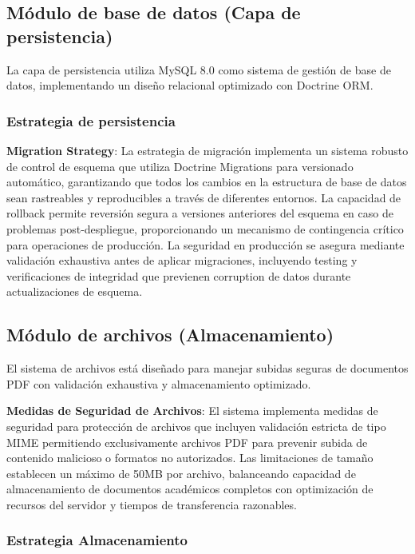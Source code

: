 \documentclass[12pt,a4paper,oneside]{report}
\begin{document}
\subsection{Módulo de base de datos (Capa de
persistencia)}\label{muxf3dulo-de-base-de-datos-capa-de-persistencia}

La capa de persistencia utiliza MySQL 8.0 como sistema de gestión de
base de datos, implementando un diseño relacional optimizado con
Doctrine ORM.

\subsubsection{Estrategia de
persistencia}\label{estrategia-de-persistencia}

\textbf{Migration Strategy}: La estrategia de migración implementa un sistema robusto de control de esquema que utiliza Doctrine Migrations para versionado automático, garantizando que todos los cambios en la estructura de base de datos sean rastreables y reproducibles a través de diferentes entornos. La capacidad de rollback permite reversión segura a versiones anteriores del esquema en caso de problemas post-despliegue, proporcionando un mecanismo de contingencia crítico para operaciones de producción. La seguridad en producción se asegura mediante validación exhaustiva antes de aplicar migraciones, incluyendo testing y verificaciones de integridad que previenen corruption de datos durante actualizaciones de esquema.

\subsection{Módulo de archivos
(Almacenamiento)}\label{muxf3dulo-de-archivos-almacenamiento}

El sistema de archivos está diseñado para manejar subidas seguras de
documentos PDF con validación exhaustiva y almacenamiento optimizado.

\textbf{Medidas de Seguridad de Archivos}: El sistema implementa medidas de seguridad para protección de archivos que incluyen validación estricta de tipo MIME permitiendo exclusivamente archivos PDF para prevenir subida de contenido malicioso o formatos no autorizados. Las limitaciones de tamaño establecen un máximo de 50MB por archivo, balanceando capacidad de almacenamiento de documentos académicos completos con optimización de recursos del servidor y tiempos de transferencia razonables.

\subsubsection{Estrategia
Almacenamiento}\label{estrategia-almacenamiento}
\end{document}
